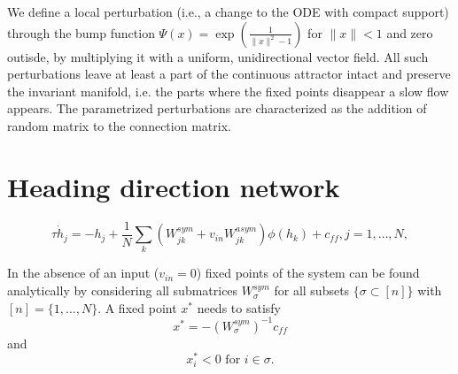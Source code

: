 \documentclass{article} %
\newcounter{ct}
\theoremstyle{definition}
\theoremstyle{remark}
\begin{document}
We define a local perturbation (i.e., a change to the ODE with compact support) through the bump function $\Psi(x) = \exp\left(\frac{1}{\|x\|^2-1}\right)$ for $\|x\|<1$ and zero outisde, by multiplying it with a uniform, unidirectional vector field. All such perturbations leave at least a part of the continuous attractor intact and preserve the invariant manifold, i.e. the parts where the fixed points disappear a slow flow appears.
The parametrized perturbations are characterized as the addition of random matrix to the connection matrix. 



\section{Heading direction network}

\begin{equation}
\tau \dot h_j = -h_j + \frac{1}{N} \sum_k (W^{sym}_{jk} + v_{in} W^{asym}_{jk})\phi(h_k)+c_{ff},     j=1,\dots,N,
\end{equation}

In the absence of an input ($v_{in}=0$) fixed points of the system can be found analytically by considering all submatrices $W^{sym}_\sigma$ for all subsets $\{\sigma\subset [n]\}$ with$[n]=\{1,\dots, N\}$.
A fixed point $x^*$ needs to satisfy
\begin{equation}
x^*= -(W^{sym}_\sigma)^{-1}c_{ff}
\end{equation}
and 
\begin{equation}
x^*_i<0 \text{   for  	 } i\in\sigma.
\end{equation}






%
\end{document}

